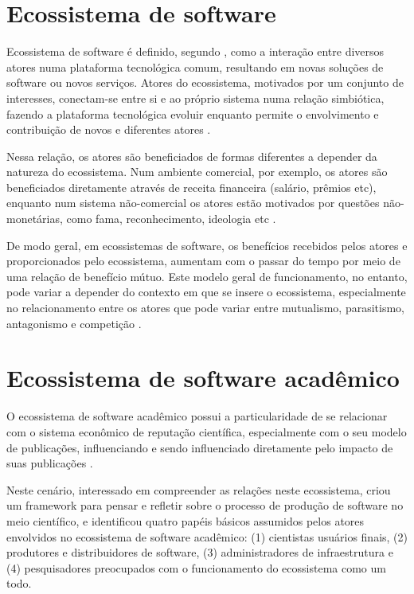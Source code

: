 \section{Ecossistema de software}

Ecossistema de software é definido, segundo ,
como a interação entre diversos atores numa plataforma tecnológica comum,
resultando em novas soluções de software ou novos serviços. Atores do
ecossistema, motivados por um conjunto de interesses, conectam-se entre si e ao
próprio sistema numa relação simbiótica, fazendo a plataforma tecnológica
evoluir enquanto permite o envolvimento e contribuição de novos e diferentes
atores \cite{manikas2013software}.

Nessa relação, os atores são beneficiados de formas diferentes a depender da
natureza do ecossistema. Num ambiente comercial, por exemplo, os atores são
beneficiados diretamente através de receita financeira (salário, prêmios etc),
enquanto num sistema não-comercial os atores estão motivados por questões
não-monetárias, como fama, reconhecimento, ideologia etc
\cite{manikas2013software}.

De modo geral, em ecossistemas de software, os benefícios recebidos pelos
atores e proporcionados pelo ecossistema, aumentam com o passar do tempo por
meio de uma relação de benefício mútuo.  Este modelo geral de funcionamento, no
entanto, pode variar a depender do contexto em que se insere o ecossistema,
especialmente no relacionamento entre os atores que pode variar entre
mutualismo, parasitismo, antagonismo e competição
\cite{manikas2013software}.

\section{Ecossistema de software acadêmico}

O ecossistema de software acadêmico possui a particularidade de se relacionar
com o sistema econômico de reputação científica, especialmente com o seu modelo
de publicações, influenciando e sendo influenciado diretamente pelo impacto de
suas publicações \cite{howison2015understanding}.

Neste cenário, interessado em compreender as relações neste ecossistema,
 criou um framework para pensar e refletir
sobre o processo de produção de software no meio científico, e identificou quatro
papéis básicos assumidos pelos atores envolvidos no ecossistema de software acadêmico: 
(1) cientistas usuários finais, (2) produtores e distribuidores de software, (3)
administradores de infraestrutura e (4) pesquisadores preocupados com o
funcionamento do ecossistema como um todo.

